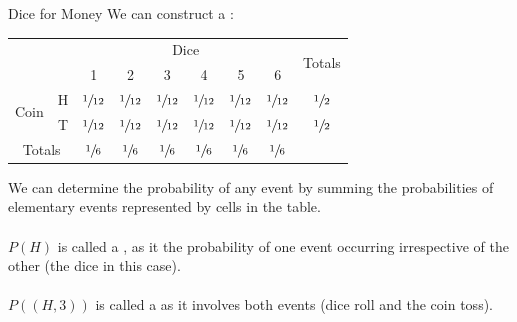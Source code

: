 \begin{examplebox}{Dice for Money}
    We can construct a :
    \begin{center}
        \begin{tabular}{c c c c c c c c c}
            \setlength{\tabcolsep}{3em}
                                       &                & \multicolumn{6}{c}{Dice} & \multirow{2}{*}{Totals}                                                                                          \\
                                       &                & 1                        & 2                       & 3               & 4               & 5               & 6                                \\
            \multirow{2}{*}{Coin}      & H              & $\sfrac{1}{12}$          & $\sfrac{1}{12}$         & $\sfrac{1}{12}$ & $\sfrac{1}{12}$ & $\sfrac{1}{12}$ & $\sfrac{1}{12}$ & $\sfrac{1}{2}$ \\
                                       & T              & $\sfrac{1}{12}$          & $\sfrac{1}{12}$         & $\sfrac{1}{12}$ & $\sfrac{1}{12}$ & $\sfrac{1}{12}$ & $\sfrac{1}{12}$ & $\sfrac{1}{2}$ \\
            \multicolumn{2}{c}{Totals} & $\sfrac{1}{6}$ & $\sfrac{1}{6}$           & $\sfrac{1}{6}$          & $\sfrac{1}{6}$  & $\sfrac{1}{6}$  & $\sfrac{1}{6}$  &                                  \\
        \end{tabular}
    \end{center}
    We can determine the probability of any event by summing the probabilities of elementary events represented by cells in the table.
    \\
    \\ $P({H})$ is called a , as it the probability of one event occurring irrespective of the other (the dice in this case).
    \\
    \\ $P({(H,3)})$ is called a  as it involves both events (dice roll and the coin toss).    
\end{examplebox}

